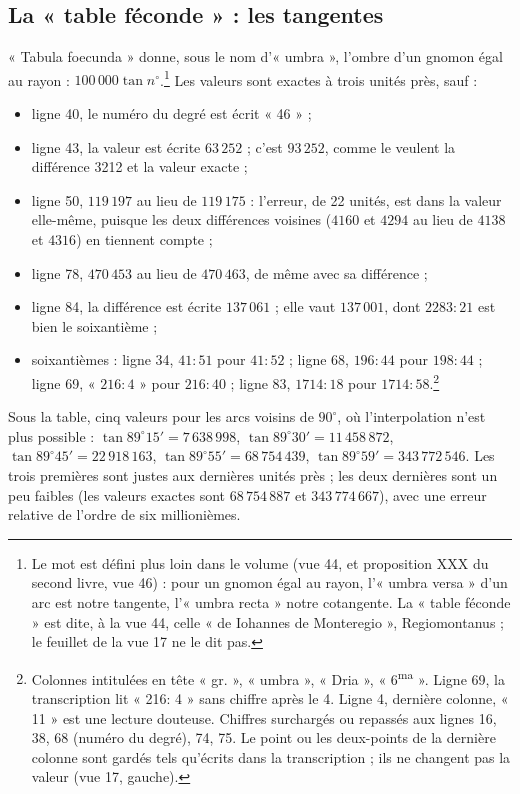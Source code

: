 \documentclass[11pt,a4paper]{article}
\begin{document}
\subsection*{La « table féconde » : les tangentes}

« Tabula foecunda » donne, sous le nom d'« umbra », l'ombre d'un gnomon égal au
rayon : $100\,000\tan n^\circ$.\footnote{Le mot est défini plus loin dans le
volume (vue 44, et proposition XXX du second livre, vue 46) : pour un gnomon
égal au rayon, l'« umbra versa » d'un arc est notre tangente, l'« umbra recta »
notre cotangente. La « table féconde » est dite, à la vue 44, celle « de
Iohannes de Monteregio », Regiomontanus ; le feuillet de la vue 17 ne le dit
pas.} Les valeurs sont exactes à trois unités près, sauf :

\begin{itemize}
  \item ligne 40, le numéro du degré est écrit « 46 » ;
  \item ligne 43, la valeur est écrite $63\,252$ ; c'est $93\,252$, comme le
    veulent la différence 3212 et la valeur exacte ;
  \item ligne 50, $119\,197$ au lieu de $119\,175$ : l'erreur, de 22 unités, est
    dans la valeur elle-même, puisque les deux différences voisines ($4160$ et
    $4294$ au lieu de $4138$ et $4316$) en tiennent compte ;
  \item ligne 78, $470\,453$ au lieu de $470\,463$, de même avec sa
    différence ;
  \item ligne 84, la différence est écrite $137\,061$ ; elle vaut $137\,001$,
    dont $2283{:}21$ est bien le soixantième ;
  \item soixantièmes : ligne 34, $41{:}51$ pour $41{:}52$ ; ligne 68,
    $196{:}44$ pour $198{:}44$ ; ligne 69, « $216{:}4$ » pour $216{:}40$ ;
    ligne 83, $1714{:}18$ pour $1714{:}58$.\footnote{Colonnes intitulées en tête
    « gr. », « umbra », « Dria », « 6\textsuperscript{ma} ». Ligne 69, la
    transcription lit « 216: 4 » sans chiffre après le 4. Ligne 4, dernière
    colonne, « 11 » est une lecture douteuse. Chiffres surchargés ou repassés
    aux lignes 16, 38, 68 (numéro du degré), 74, 75. Le point ou les deux-points
    de la dernière colonne sont gardés tels qu'écrits dans la transcription ;
    ils ne changent pas la valeur (vue 17, gauche).}
\end{itemize}

Sous la table, cinq valeurs pour les arcs voisins de $90^\circ$, où
l'interpolation n'est plus possible : $\tan 89^\circ 15' = 7\,638\,998$,
$\tan 89^\circ 30' = 11\,458\,872$, $\tan 89^\circ 45' = 22\,918\,163$,
$\tan 89^\circ 55' = 68\,754\,439$, $\tan 89^\circ 59' = 343\,772\,546$. Les
trois premières sont justes aux dernières unités près ; les deux dernières sont
un peu faibles (les valeurs exactes sont $68\,754\,887$ et $343\,774\,667$), avec
une erreur relative de l'ordre de six millionièmes.
\end{document}
